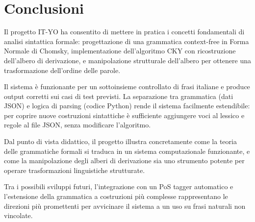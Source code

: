 \documentclass[12pt, a4paper]{article}
\begin{document}
\section{Conclusioni}

Il progetto IT-YO ha consentito di mettere in pratica i concetti fondamentali
di analisi sintattica formale: progettazione di una grammatica context-free
in Forma Normale di Chomsky, implementazione dell'algoritmo CKY con ricostruzione
dell'albero di derivazione, e manipolazione strutturale dell'albero per ottenere
una trasformazione dell'ordine delle parole.

Il sistema è funzionante per un sottoinsieme controllato di frasi italiane e
produce output corretti sui casi di test previsti. La separazione tra grammatica
(dati JSON) e logica di parsing (codice Python) rende il sistema facilmente
estendibile: per coprire nuove costruzioni sintattiche è sufficiente aggiungere
voci al lessico e regole al file JSON, senza modificare l'algoritmo.

Dal punto di vista didattico, il progetto illustra concretamente come la teoria
delle grammatiche formali si traduca in un sistema computazionale funzionante,
e come la manipolazione degli alberi di derivazione sia uno strumento potente
per operare trasformazioni linguistiche strutturate.

Tra i possibili sviluppi futuri, l'integrazione con un PoS tagger automatico e
l'estensione della grammatica a costruzioni più complesse rappresentano le
direzioni più promettenti per avvicinare il sistema a un uso su frasi naturali
non vincolate.
\end{document}
